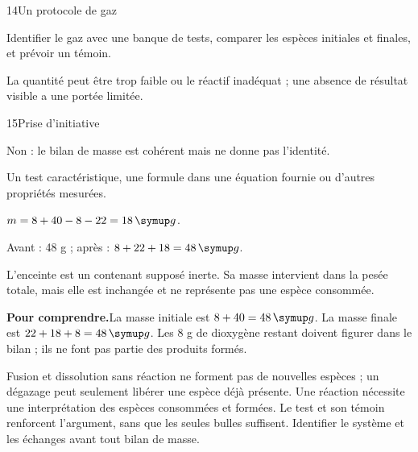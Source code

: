 \par\noindent\begin{minipage}{\linewidth}
\begin{corrige}{14}{Un protocole de gaz}
\begin{questions}
\item Identifier le gaz avec une banque de tests, comparer les espèces initiales et finales, et prévoir un témoin.
\item La quantité peut être trop faible ou le réactif inadéquat ; une absence de résultat visible a une portée limitée.
\end{questions}
\end{corrige}
\end{minipage}
\par\noindent\begin{minipage}{\linewidth}
\begin{corrige}{15}{Prise d’initiative}
\begin{questions}
\item Non : le bilan de masse est cohérent mais ne donne pas l’identité.
\item Un test caractéristique, une formule dans une équation fournie ou d’autres propriétés mesurées.
\end{questions}
\end{corrige}
\end{minipage}
\par\noindent\begin{minipage}{\linewidth}
\label{cor-defi-3}\begin{questions}
\item $m=8+40-8-22=18\unite g$.
\item Avant : 48 g ; après : $8+22+18=48\unite g$.
\item L’enceinte est un contenant supposé inerte. Sa masse intervient dans la pesée totale, mais elle est inchangée et ne représente pas une espèce consommée.
\end{questions}
\par\smallskip\noindent\textbf{Pour comprendre.}\enspace La masse initiale est $8+40=48\unite g$. La masse finale est $22+18+8=48\unite g$. Les 8 g de dioxygène restant doivent figurer dans le bilan ; ils ne font pas partie des produits formés.\par
{}
\end{minipage}
\par\noindent\begin{minipage}{\linewidth}
\label{cor-activite-3}
Fusion et dissolution sans réaction ne forment pas de nouvelles espèces ; un dégazage peut seulement libérer une espèce déjà présente. Une réaction nécessite une interprétation des espèces consommées et formées. Le test et son témoin renforcent l’argument, sans que les seules bulles suffisent. Identifier le système et les échanges avant tout bilan de masse.\par\end{minipage}
